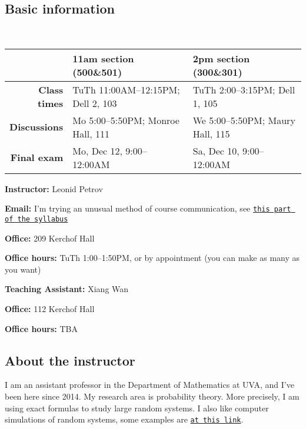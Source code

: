 \documentclass[oneside,11pt]{amsart}
\begin{document}
\subsection{Basic information}{\ }

\vspace{5pt}

\begin{tabular}{r|l|l}
	\hline
	&\textbf{11am section (500\&501)} & \textbf{2pm section (300\&301)}
	\\\hline
	\textbf{Class times}&TuTh 11:00AM--12:15PM; Dell 2, 103 & TuTh 2:00--3:15PM; Dell 1, 105 
	\\\hline
	\textbf{Discussions}&Mo 5:00--5:50PM; Monroe Hall, 111
	&
	We 5:00--5:50PM; Maury Hall, 115
	\\\hline
	\textbf{Final exam}&
	Mo, Dec 12, 9:00--12:00AM&
	Sa, Dec 10,	9:00--12:00AM
	\\\hline
\end{tabular}

\vspace{10pt}

\parbox{.5\textwidth}{

\textbf{Instructor:} Leonid Petrov

\textbf{Email:} I'm trying an unusual method of course communication, see \hyperref[comm]{\texttt{this part of the syllabus}}

\textbf{Office:} 209 Kerchof Hall

\textbf{Office hours:} TuTh 1:00--1:50PM,
or by appointment (you can make as many as you want)}\hspace{30pt}
\parbox{.4\textwidth}{

\textbf{Teaching Assistant:} Xiang Wan

\textbf{Office:} 112 Kerchof Hall

\textbf{Office hours:} TBA}

\vspace{5pt}

\subsection{About the instructor}
I am an assistant professor in the Department of Mathematics at UVA, and I've been here since 2014. My research area is probability theory. More precisely, I am using exact formulas to study large random systems. I also like computer simulations of random systems, some examples are \href{http://faculty.virginia.edu/petrov//blog/2015/02/20/Shapes%20with%20holes/}{\texttt{at this link}}.
\end{document}
